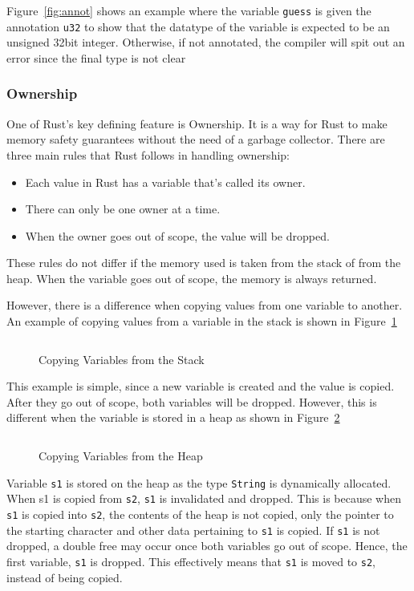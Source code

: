 \documentclass{article}
\newcommand{\rust}[1]{\inputminted{rust}{samples/rust/#1.rs}}
\newcommand{\rustin}[1]{\texttt{#1}}
\begin{document}
  Figure~\ref{fig:annot} shows an example where the variable \rustin{guess} is
  given the annotation \rustin{u32} to show that the datatype of the variable is
  expected to be an unsigned 32bit integer. Otherwise, if not annotated, the
  compiler will spit out an error since the final type is not clear

  \subsubsection{Ownership}
  One of Rust's key defining feature is Ownership. It is a way for Rust to make
  memory safety guarantees without the need of a garbage collector. There are
  three main rules that Rust follows in handling ownership:

  \begin{itemize}
    \item Each value in Rust has a variable that’s called its owner.
    \item There can only be one owner at a time.
    \item When the owner goes out of scope, the value will be dropped.
  \end{itemize}

  These rules do not differ if the memory used is taken from the stack of from
  the heap. When the variable goes out of scope, the memory is always returned.

  However, there is a difference when copying values from one variable to
  another. An example of copying values from a variable in the stack is shown in
  Figure~\ref{fig:copy-stack}

  \begin{figure}[ht]
    \rust{copy-stack}
    \caption{Copying Variables from the Stack}
    \label{fig:copy-stack}
  \end{figure}

  This example is simple, since a new variable is created and the value is
  copied. After they go out of scope, both variables will be dropped. However,
  this is different when the variable is stored in a heap as shown in
  Figure~\ref{fig:copy-heap}

  \begin{figure}[ht]
    \rust{copy-heap}
    \caption{Copying Variables from the Heap}
    \label{fig:copy-heap}
  \end{figure}

  Variable \rustin{s1} is stored on the heap as the type \rustin{String} is
  dynamically allocated. When s1 is copied from \rustin{s2}, \rustin{s1} is
  invalidated and dropped. This is because when \rustin{s1} is copied into
  \rustin{s2}, the contents of the heap is not copied, only the pointer to the
  starting character and other data pertaining to \rustin{s1} is copied. If
  \rustin{s1} is not dropped, a double free may occur once both variables go out
  of scope. Hence, the first variable, \rustin{s1} is dropped. This effectively
  means that \rustin{s1} is moved to \rustin{s2}, instead of being copied.
\end{document}
